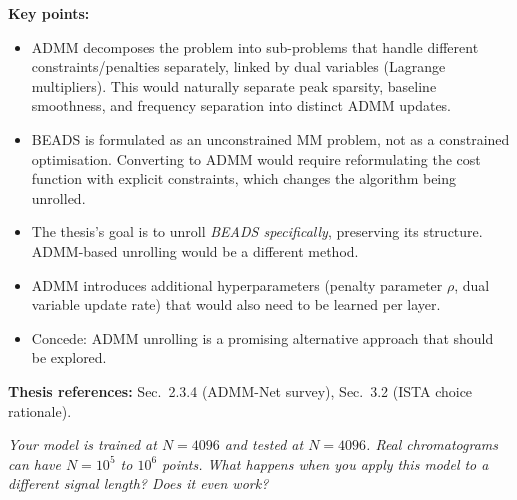 \documentclass[11pt, letterpaper]{article}
\newcounter{qcounter}
\newcommand{\question}[1]{%
  \stepcounter{qcounter}%
  \begin{questionbox}[Q\theqcounter]%
    \itshape #1%
  \end{questionbox}%
}
\begin{document}
\begin{answerbox}
\textbf{Key points:}
\begin{itemize}[nosep]
  \item ADMM decomposes the problem into sub-problems that handle
        different constraints/penalties separately, linked by dual
        variables (Lagrange multipliers).  This would naturally
        separate peak sparsity, baseline smoothness, and frequency
        separation into distinct ADMM updates.
  \item BEADS is formulated as an unconstrained MM problem, not as
        a constrained optimisation.  Converting to ADMM would require
        reformulating the cost function with explicit constraints,
        which changes the algorithm being unrolled.
  \item The thesis's goal is to unroll \emph{BEADS specifically},
        preserving its structure.  ADMM-based unrolling would be a
        different method.
  \item ADMM introduces additional hyperparameters (penalty parameter
        $\rho$, dual variable update rate) that would also need to be
        learned per layer.
  \item Concede: ADMM unrolling is a promising alternative approach
        that should be explored.
\end{itemize}
\textbf{Thesis references:} Sec.~2.3.4 (ADMM-Net survey), Sec.~3.2 (ISTA choice rationale).
\end{answerbox}

\question{Your model is trained at $N{=}4096$ and tested at $N{=}4096$.
Real chromatograms can have $N{=}10^5$ to $10^6$ points.  What
happens when you apply this model to a different signal length?
Does it even work?}
\end{document}
